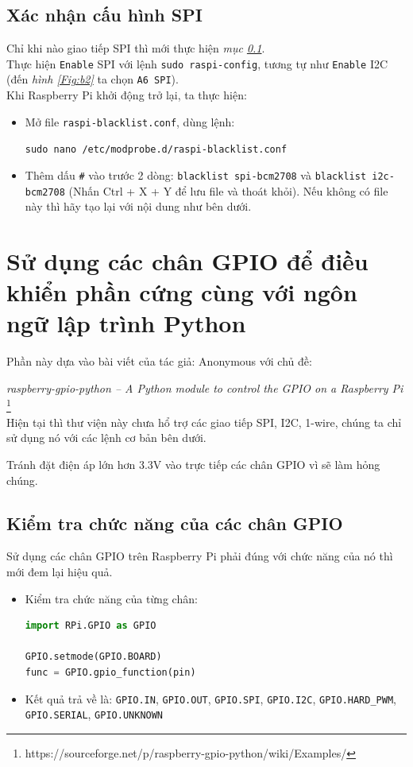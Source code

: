 \subsection{Xác nhận cấu hình SPI}\label{Sub:SPI}
Chỉ khi nào giao tiếp SPI thì mới thực hiện \textit{mục \ref{Sub:SPI}}.\\

Thực hiện \verb|Enable| SPI với lệnh \verb|sudo raspi-config|, tương tự như \verb|Enable| I2C (đến \textit{hình \ref{Fig:b2}} ta chọn \verb|A6 SPI|).\\

Khi Raspberry Pi khởi động trở lại, ta thực hiện:
\begin{itemize}
\item Mở file \verb|raspi-blacklist.conf|, dùng lệnh:
\begin{center}
\verb|sudo nano /etc/modprobe.d/raspi-blacklist.conf|
\end{center}
\item Thêm dấu \verb|#| vào trước 2 dòng: \verb|blacklist spi-bcm2708| và \verb|blacklist i2c-bcm2708| (Nhấn Ctrl + X + Y để lưu file và thoát khỏi). Nếu không có file này thì hãy tạo lại với nội dung như bên dưới.
\end{itemize}
\section{Sử dụng các chân GPIO để điều khiển phần cứng cùng với ngôn ngữ lập trình Python}
Phần này dựa vào bài viết của tác giả: \textsf{Anonymous} với chủ đề:

\textit{raspberry-gpio-python -- A Python module to control the GPIO on a Raspberry Pi} \footnote{\textsf{https://sourceforge.net/p/raspberry-gpio-python/wiki/Examples/}}\\

Hiện tại thì thư viện này chưa hổ trợ các giao tiếp SPI, I2C, 1-wire, chúng ta chỉ sử dụng nó với các lệnh cơ bản bên dưới.

Tránh đặt điện áp lớn hơn 3.3V vào trực tiếp các chân GPIO vì sẽ làm hỏng chúng.
\subsection{Kiểm tra chức năng của các chân GPIO}
Sử dụng các chân GPIO trên Raspberry Pi phải đúng với chức năng của nó thì mới đem lại hiệu quả.
\begin{itemize}
\item Kiểm tra chức năng của từng chân:
\begin{lstlisting}[language=Python]
import RPi.GPIO as GPIO

GPIO.setmode(GPIO.BOARD)
func = GPIO.gpio_function(pin)
\end{lstlisting}
\item Kết quả trả về là: \verb|GPIO.IN|, \verb|GPIO.OUT|, \verb|GPIO.SPI|, \verb|GPIO.I2C|, \verb|GPIO.HARD_PWM|, \verb|GPIO.SERIAL|, \verb|GPIO.UNKNOWN|
\end{itemize}

